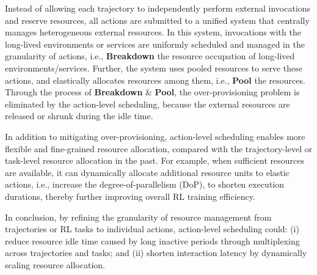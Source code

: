 Instead of allowing each trajectory to independently perform external invocations and reserve resources, all actions are submitted to a unified system that centrally manages heterogeneous external resources. 
In this system, invocations with the long-lived environments or services are uniformly scheduled and managed in the granularity of actions, i.e., \textbf{Breakdown} the resource occupation of long-lived environments/services. 
Further, the system uses pooled resources to serve these actions, and elastically allocates resources among them, i.e., \textbf{Pool} the resources. 
Through the process of \textbf{Breakdown} \& \textbf{Pool}, the over-provisioning problem is eliminated by the action-level scheduling, because the external resources are released or shrunk during the idle time.

In addition to mitigating over-provisioning, action-level scheduling enables more flexible and fine-grained resource allocation, compared with the trajectory-level or task-level resource allocation in the past.
For example, when sufficient resources are available, it can dynamically allocate additional resource units to elastic actions, i.e., increase the degree-of-parallelism (DoP), to shorten execution durations, thereby further improving overall RL training efficiency.

In conclusion, by refining the granularity of resource management from trajectories or RL tasks to individual actions, action-level scheduling could:
(i) reduce resource idle time caused by long inactive periods through multiplexing across trajectories and tasks; and
(ii) shorten interaction latency by dynamically scaling resource allocation.




